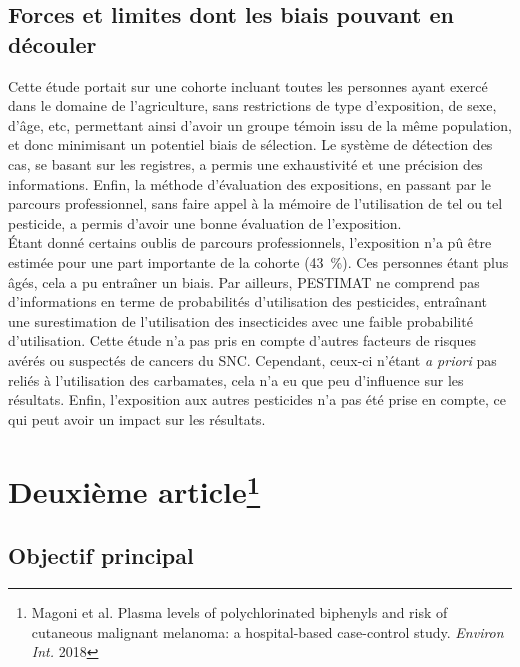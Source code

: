 \documentclass[10pt]{article}
\begin{document}
\subsection{Forces et limites dont les biais pouvant en découler}
Cette étude portait sur une cohorte incluant toutes les personnes ayant exercé dans le domaine de l'agriculture, sans restrictions de type d'exposition, de sexe, d'âge, etc, permettant ainsi d'avoir un groupe témoin issu de la même population, et donc minimisant un potentiel biais de sélection. Le système de détection des cas, se basant sur les registres, a permis une exhaustivité et une précision des informations. Enfin, la méthode d'évaluation des expositions, en passant par le parcours professionnel, sans faire appel à la mémoire de l'utilisation de tel ou tel pesticide, a permis d'avoir une bonne évaluation de l'exposition.\\

\'{E}tant donné certains oublis de parcours professionnels, l'exposition n'a pû être estimée pour une part importante de la cohorte (43~\%). Ces personnes étant plus âgés, cela a pu entraîner un biais. Par ailleurs, PESTIMAT ne comprend pas d'informations en terme de probabilités d'utilisation des pesticides, entraînant une surestimation de l'utilisation des insecticides avec une faible probabilité d'utilisation. 
Cette étude n'a pas pris en compte d'autres facteurs de risques avérés ou suspectés de cancers du SNC. Cependant, ceux-ci n'étant \emph{a priori} pas reliés à l'utilisation des carbamates, cela n'a eu que peu d'influence sur les résultats. 
Enfin, l'exposition aux autres pesticides n'a pas été prise en compte, ce qui peut avoir un impact sur les résultats. 

\newpage
\section{Deuxième article\protect\footnote{Magoni et al. Plasma levels of polychlorinated biphenyls and risk of cutaneous malignant melanoma: a hospital-based case-control study. \emph{Environ Int.} 2018}}
\subsection{Objectif principal}
\end{document}
